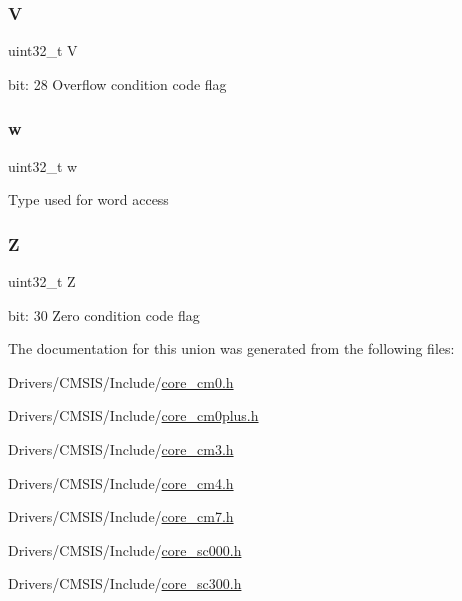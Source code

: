 \subsubsection{\texorpdfstring{V}{V}}
{\footnotesize\ttfamily uint32\+\_\+t V}

bit\+: 28 Overflow condition code flag \mbox{\label{unionx_p_s_r___type_ad0fb62e7a08e70fc5e0a76b67809f84b}} 
\subsubsection{\texorpdfstring{w}{w}}
{\footnotesize\ttfamily uint32\+\_\+t w}

Type used for word access \mbox{\label{unionx_p_s_r___type_a5ae954cbd9986cd64625d7fa00943c8e}} 
\subsubsection{\texorpdfstring{Z}{Z}}
{\footnotesize\ttfamily uint32\+\_\+t Z}

bit\+: 30 Zero condition code flag 

The documentation for this union was generated from the following files\+:\begin{DoxyCompactItemize}
\item 
Drivers/\+C\+M\+S\+I\+S/\+Include/\mbox{\hyperlink{core__cm0_8h}{core\+\_\+cm0.\+h}}\item 
Drivers/\+C\+M\+S\+I\+S/\+Include/\mbox{\hyperlink{core__cm0plus_8h}{core\+\_\+cm0plus.\+h}}\item 
Drivers/\+C\+M\+S\+I\+S/\+Include/\mbox{\hyperlink{core__cm3_8h}{core\+\_\+cm3.\+h}}\item 
Drivers/\+C\+M\+S\+I\+S/\+Include/\mbox{\hyperlink{core__cm4_8h}{core\+\_\+cm4.\+h}}\item 
Drivers/\+C\+M\+S\+I\+S/\+Include/\mbox{\hyperlink{core__cm7_8h}{core\+\_\+cm7.\+h}}\item 
Drivers/\+C\+M\+S\+I\+S/\+Include/\mbox{\hyperlink{core__sc000_8h}{core\+\_\+sc000.\+h}}\item 
Drivers/\+C\+M\+S\+I\+S/\+Include/\mbox{\hyperlink{core__sc300_8h}{core\+\_\+sc300.\+h}}\end{DoxyCompactItemize}
